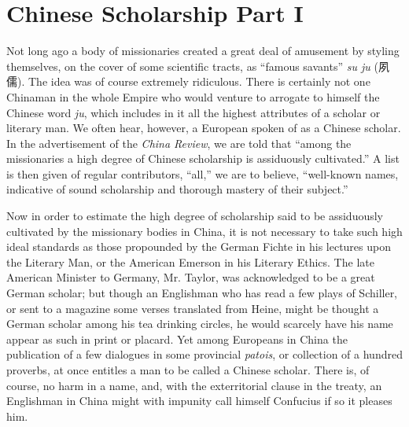 
\chapter[Chinese Scholarship Part I]
{Chinese Scholarship Part I}


Not long ago a body of missionaries created a great deal of amusement by styling themselves,
on the cover of some scientific tracts, as ``famous savants'' \emph{su ju} (夙儒).
The idea was of course extremely ridiculous. There is certainly not one Chinaman in the whole Empire who would venture to arrogate to himself the Chinese word \emph{ju},
which includes in it all the highest attributes of a scholar or literary man.
We often hear, however, a European spoken of as a Chinese scholar.
In the advertisement of the \emph{China Review}, we are told that
``among the missionaries a high degree of Chinese scholarship is assiduously cultivated.''
A list is then given of regular contributors,
``all,'' we are to believe, ``well-known names, indicative of sound scholarship and thorough mastery of their subject.''

Now in order to estimate the high degree of scholarship said to be assiduously cultivated by the missionary bodies in China,
it is not necessary to take such high ideal standards
as those propounded by the German Fichte in his lectures upon the Literary Man,
or the American Emerson in his Literary Ethics.
The late American Minister to Germany, Mr. Taylor, was acknowledged to be a great German scholar;
but though an Englishman who has read a few plays of Schiller,
or sent to a magazine some verses translated from Heine,
might be thought a German scholar among his tea drinking circles,
he would scarcely have his name appear as such in print or placard.
Yet among Europeans in China the publication of a few dialogues in some provincial \emph{patois},
or collection of a hundred proverbs, at once entitles
a man to be called a Chinese scholar.
There is, of course, no harm in a name,
and, with the exterritorial clause in the treaty,
an Englishman in China might with impunity call himself Confucius if so it pleases him.

